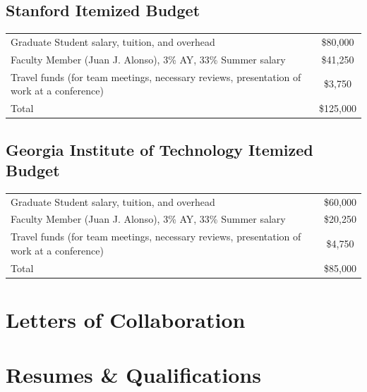 \documentclass[]{aiaa-tc}
\begin{document}
  \subsection{Stanford Itemized Budget}
    \begin{table}\begin{tabular}{l c}
    Graduate Student salary, tuition, and overhead &  \$80,000 \\
    Faculty Member (Juan J. Alonso), 3\% AY, 33\% Summer salary & \$41,250 \\
    Travel funds (for team meetings, necessary reviews, presentation of work at a conference) & \$3,750 \\
    \hline
    Total & \$125,000 \\ 
    \hline
    \end{tabular}\end{table}
  \subsection{Georgia Institute of Technology Itemized Budget}

    \begin{table}\begin{tabular}{l c}
    Graduate Student salary, tuition, and overhead &  \$60,000 \\
    Faculty Member (Juan J. Alonso), 3\% AY, 33\% Summer salary & \$20,250 \\
    Travel funds (for team meetings, necessary reviews, presentation of work at a conference) & \$4,750 \\
    \hline
    Total & \$85,000 \\ 
    \hline
    \end{tabular}\end{table}

  \clearpage

  \section{Letters of Collaboration}

    
    
    
    \restoregeometry


  \section{Resumes \& Qualifications}
\end{document}
